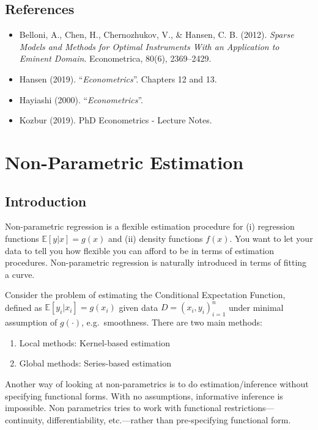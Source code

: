 \documentclass[12pt,]{book}
\providecommand{\tightlist}{%
  \setlength{\itemsep}{0pt}\setlength{\parskip}{0pt}}
\begin{document}
\hypertarget{references-6}{%
\section{References}\label{references-6}}

\begin{itemize}
\tightlist
\item
  Belloni, A., Chen, H., Chernozhukov, V., \& Hansen, C. B. (2012). \emph{Sparse Models and Methods for Optimal Instruments With an Application to Eminent Domain}. Econometrica, 80(6), 2369--2429.
\item
  Hansen (2019). ``\emph{Econometrics}''. Chapters 12 and 13.
\item
  Hayiashi (2000). ``\emph{Econometrics}''.
\item
  Kozbur (2019). PhD Econometrics - Lecture Notes.
\end{itemize}

\hypertarget{lecture4}{%
\chapter{Non-Parametric Estimation}\label{lecture4}}

\hypertarget{introduction}{%
\section{Introduction}\label{introduction}}

Non-parametric regression is a flexible estimation procedure for (i) regression functions \(\mathbb E [y|x ] = g (x)\) and (ii) density functions \(f(x)\). You want to let your data to tell you how flexible you can afford to be in terms of estimation procedures. Non-parametric regression is naturally introduced in terms of fitting a curve.

Consider the problem of estimating the Conditional Expectation Function, defined as \(\mathbb E [y_i |x_i ] = g(x_i)\) given data \(D = (x_i, y_i)_{i=1}^n\) under minimal assumption of \(g(\cdot)\), e.g.~smoothness. There are two main methods:

\begin{enumerate}
\def\labelenumi{\arabic{enumi}.}
\tightlist
\item
  Local methods: Kernel-based estimation
\item
  Global methods: Series-based estimation
\end{enumerate}

Another way of looking at non-parametrics is to do estimation/inference without specifying functional forms. With no assumptions, informative inference is impossible. Non parametrics tries to work with functional restrictions---continuity, differentiability, etc.---rather than pre-specifying functional form.
\end{document}
